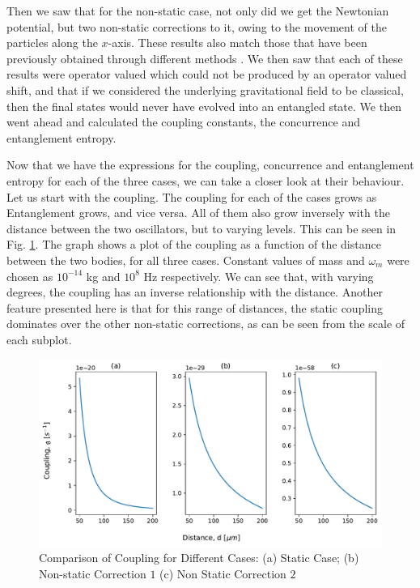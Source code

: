 \documentclass[12pt,a4paper]{report}
\theoremstyle{plain}
\theoremstyle{definition}
\theoremstyle{remark}
\begin{document}
Then we saw that for the non-static case, not only did we get the Newtonian potential, but two non-static corrections to it, owing to the movement of the particles along the $x$-axis. These results also match those that have been previously obtained through different methods \cite{Bose_2022, Christofoli, yoichi, Hiida, grignani}. We then saw that each of these results were operator valued which could not be produced by an operator valued shift, and that if we considered the underlying gravitational field to be classical, then the final states would never have evolved into an entangled state. We then went ahead and calculated the coupling constants, the concurrence and entanglement entropy.

Now that we have the expressions for the coupling, concurrence and entanglement entropy for each of the three cases, we can take a closer look at their behaviour.
Let us start with the coupling. The coupling for each of the cases grows as Entanglement grows, and vice versa. All of them also grow inversely with the distance between the two oscillators, but to varying levels. This can be seen in Fig. \ref{fig: Coupling}. The graph shows a plot of the coupling as a function of the distance between the two bodies, for all three cases. Constant values of mass and $\omega_m$ were chosen as $10^{-14}$ kg and $10^8$ Hz respectively. We can see that, with varying degrees, the coupling has an inverse relationship with the distance. Another feature presented here is that for this range of distances, the static coupling dominates over the other non-static corrections, as can be seen from the scale of each subplot.
\begin{figure}[h]
    \centering
    \includegraphics[width=15cm]{Coupling.pdf}
    \caption{Comparison of Coupling for Different Cases:  (a) Static Case; (b) Non-static Correction $1$ (c) Non Static Correction $2$}
    \label{fig: Coupling}
\end{figure}
\end{document}
